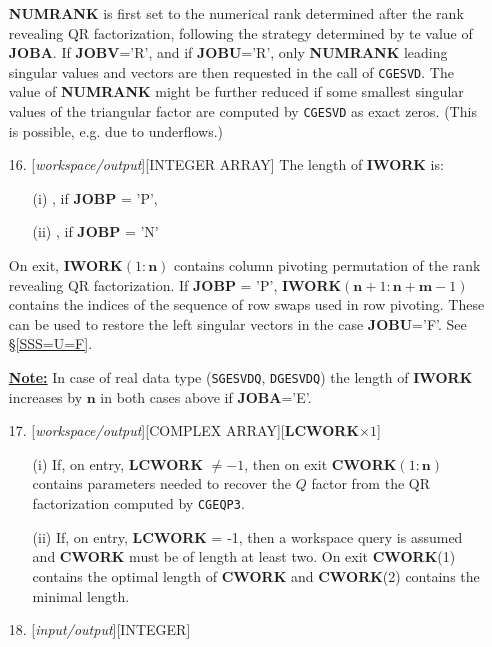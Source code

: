 \documentclass[12pt, a4paper, final]{article}
\numberwithin{equation}{section}
\begin{document}
\begin{itemize}
	\textbf{NUMRANK} is first set to the numerical rank determined after the rank revealing QR factorization, following the strategy determined by te value of \textbf{JOBA}. If \textbf{JOBV}='R', and if \textbf{JOBU}='R', only \textbf{NUMRANK} leading singular values and vectors are then requested in the call of \texttt{CGESVD}. The value of  \textbf{NUMRANK} might be further reduced if some smallest singular values of the triangular factor are computed by \texttt{CGESVD} as exact zeros. (This is possible, e.g. due to underflows.)
	\item[16.]  [\emph{workspace/output}][{\sc INTEGER ARRAY}]
	The length of \textbf{IWORK} is:
	\begin{itemize}
		\item[(i)] ,  if \textbf{JOBP} = 'P', 
		\item[(ii)] , \hspace{1.3cm} if \textbf{JOBP} = 'N'
	\end{itemize} 
	On exit, \textbf{IWORK}$(1:\mathbf{n})$ contains column pivoting permutation of the rank revealing QR factorization.
	If \textbf{JOBP} = 'P', \textbf{IWORK}$(\mathbf{n}+1:\mathbf{n}+\mathbf{m}-1)$ contains the indices of the sequence of row swaps used in row pivoting. These can be used to restore the left singular vectors in the case \textbf{JOBU}='F'. See \S \ref{SSS=U=F}.
	
	\underline{\textbf{Note:}} In case of real data type (\texttt{SGESVDQ}, \texttt{DGESVDQ}) the length of \textbf{IWORK} increases by $\mathbf{n}$ in both cases above if \textbf{JOBA}='E'.
	\item[17.]  [\emph{workspace/output}][{\sc COMPLEX ARRAY}][\textbf{LCWORK}$\times 1$]
	\begin{itemize}
		\item[(i)] If, on entry, \textbf{LCWORK} $\neq -1$, then on exit \textbf{CWORK}$(1:\mathbf{n})$ contains parameters needed to recover the $Q$ factor from the QR factorization computed by \texttt{CGEQP3}.
		
		\item[(ii)] If, on entry, \textbf{LCWORK} = -1, then a workspace query is assumed and \textbf{CWORK} must be of length at least two.
		On exit \textbf{CWORK}(1) contains the optimal length of \textbf{CWORK} and \textbf{CWORK}(2) contains the minimal length.
	\end{itemize}
	\item[18.]  [\emph{input/output}][{\sc INTEGER}]
	

\end{itemize}
\end{document}

